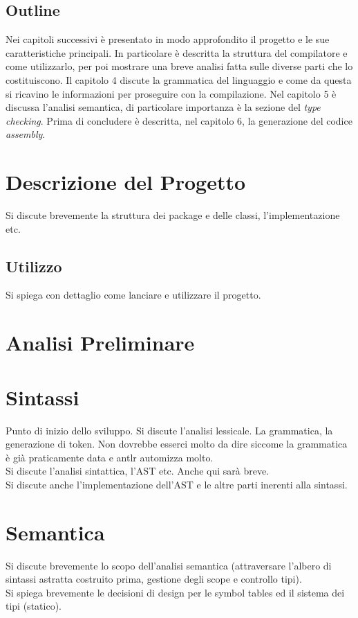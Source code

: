 \documentclass{scrreprt}
\begin{document}
\section{Outline}
Nei capitoli successivi è presentato in modo approfondito il progetto e le sue caratteristiche principali. In particolare è descritta la struttura del compilatore e come utilizzarlo, per poi mostrare una breve analisi fatta sulle diverse parti che lo costituiscono. Il capitolo 4 discute la grammatica del linguaggio e come da questa si ricavino le informazioni per proseguire con la compilazione. Nel capitolo 5 è discussa l'analisi semantica, di particolare importanza è la sezione del \textit{type checking}. Prima di concludere è descritta, nel capitolo 6, la generazione del codice \textit{assembly}.

\chapter{Descrizione del Progetto}
Si discute brevemente la struttura dei package e delle classi, l'implementazione etc.

\section{Utilizzo}
Si spiega con dettaglio come lanciare e utilizzare il progetto.

\chapter{Analisi Preliminare}

\chapter{Sintassi}
Punto di inizio dello sviluppo. Si discute l'analisi lessicale. La grammatica, la generazione di token.
Non dovrebbe esserci molto da dire siccome la grammatica è già praticamente data e antlr automizza molto.\\
Si discute l'analisi sintattica, l'AST etc. Anche qui sarà breve.\\
Si discute anche l'implementazione dell'AST e le altre parti inerenti alla sintassi.

\chapter{Semantica}
Si discute brevemente lo scopo dell'analisi semantica (attraversare l'albero di sintassi astratta costruito prima, gestione
degli scope e controllo tipi).\\
Si spiega brevemente le decisioni di design per le symbol tables ed il sistema dei tipi (statico).
\end{document}
